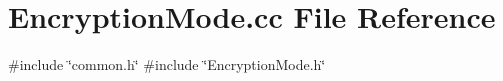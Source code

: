 \section{Encryption\+Mode.\+cc File Reference}
\label{EncryptionMode_8cc}
{\ttfamily \#include \char`\"{}common.\+h\char`\"{}}\newline
{\ttfamily \#include \char`\"{}Encryption\+Mode.\+h\char`\"{}}\newline
